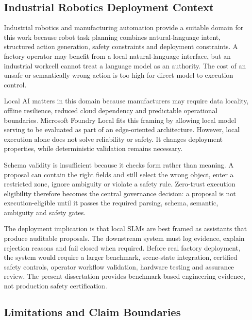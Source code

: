 \documentclass[sigconf,nonacm]{acmart}
\begin{document}
\subsection{Industrial Robotics Deployment Context}
\label{sec:industrial_robotics_context}

Industrial robotics and manufacturing automation provide a suitable domain for this work because robot task planning combines natural-language intent, structured action generation, safety constraints and deployment constraints. A factory operator may benefit from a local natural-language interface, but an industrial workcell cannot treat a language model as an authority. The cost of an unsafe or semantically wrong action is too high for direct model-to-execution control.

Local AI matters in this domain because manufacturers may require data locality, offline resilience, reduced cloud dependency and predictable operational boundaries. Microsoft Foundry Local fits this framing by allowing local model serving to be evaluated as part of an edge-oriented architecture. However, local execution alone does not solve reliability or safety. It changes deployment properties, while deterministic validation remains necessary.

Schema validity is insufficient because it checks form rather than meaning. A proposal can contain the right fields and still select the wrong object, enter a restricted zone, ignore ambiguity or violate a safety rule. Zero-trust execution eligibility therefore becomes the central governance decision: a proposal is not execution-eligible until it passes the required parsing, schema, semantic, ambiguity and safety gates.

The deployment implication is that local SLMs are best framed as assistants that produce auditable proposals. The downstream system must log evidence, explain rejection reasons and fail closed when required. Before real factory deployment, the system would require a larger benchmark, scene-state integration, certified safety controls, operator workflow validation, hardware testing and assurance review. The present dissertation provides benchmark-based engineering evidence, not production safety certification.

\subsection{Limitations and Claim Boundaries}
\label{sec:limitations_claim_boundaries}
\end{document}
